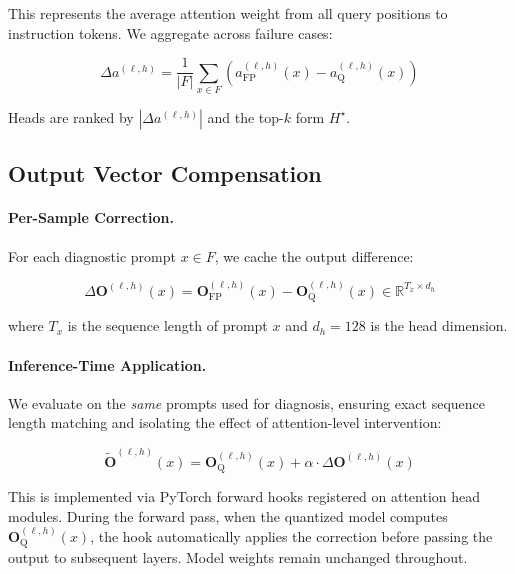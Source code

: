 This represents the average attention weight from all query positions to 
instruction tokens. We aggregate across failure cases:

\begin{equation}
\Delta a^{(\ell,h)} = \frac{1}{|F|} \sum_{x \in F} 
\left( a^{(\ell,h)}_{\text{FP}}(x) - a^{(\ell,h)}_{\text{Q}}(x) \right)
\end{equation}

Heads are ranked by $|\Delta a^{(\ell,h)}|$ and the top-$k$ form $H^{\star}$.

\subsection{Output Vector Compensation}
\label{app:output-compensation}

\paragraph{Per-Sample Correction.}
For each diagnostic prompt $x \in F$, we cache the output difference:

\begin{equation}
\Delta\mathbf{O}^{(\ell,h)}(x) = 
\mathbf{O}^{(\ell,h)}_{\text{FP}}(x) - \mathbf{O}^{(\ell,h)}_{\text{Q}}(x)
\in \mathbb{R}^{T_x \times d_h}
\end{equation}

where $T_x$ is the sequence length of prompt $x$ and $d_h=128$ is the head 
dimension.

\paragraph{Inference-Time Application.}
We evaluate on the \textit{same} prompts used for diagnosis, ensuring exact 
sequence length matching and isolating the effect of attention-level intervention:

\begin{equation}
\tilde{\mathbf{O}}^{(\ell,h)}(x) = 
\mathbf{O}^{(\ell,h)}_{\text{Q}}(x) + \alpha \cdot \Delta\mathbf{O}^{(\ell,h)}(x)
\end{equation}

This is implemented via PyTorch forward hooks registered on attention head 
modules. During the forward pass, when the quantized model computes 
$\mathbf{O}^{(\ell,h)}_{\text{Q}}(x)$, the hook automatically applies the 
correction before passing the output to subsequent layers. Model weights remain 
unchanged throughout.

